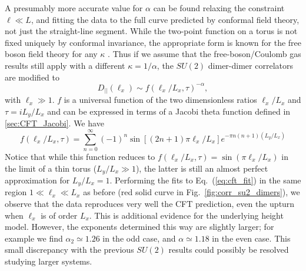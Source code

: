 \documentclass[11pt]{iopart}
\begin{document}
A presumably more accurate value for $\alpha$ can be found relaxing the constraint $\ell \ll L$, and fitting the data to the full curve predicted by conformal field theory, not just the straight-line segment. While the two-point function on a torus is not fixed uniquely by conformal invariance, the appropriate form is known for the free boson field theory for any $\kappa$ \cite{BigYellowBook}. Thus if we assume that the free-boson/Coulomb gas results still apply with a different $\kappa=1/\alpha$,  the $SU(2)$ dimer-dimer correlators are modified to 
\begin{equation}\label{eq:cft_fit}
 D_{||}(\ell_x)\sim f(\ell_x/L_x,\tau)^{-\alpha},
\end{equation}
with $\ell_x \gg 1$. $f$ is a universal function of the two dimensionless ratios $\ell_x/L_x$ and $\tau =i L_y/L_x$ and can be expressed in terms of a Jacobi theta function defined in \ref{sec:CFT_Jacobi}. We have 
\begin{equation}
 f(\ell_x/L_x,\tau)=\sum_{n=0}^{\infty}(-1)^n \sin \left[(2n+1)\pi \ell_x/L_x\right]e^{-\pi n(n+1)(L_y/L_x)}
\end{equation}
Notice that while this function reduces to $f(\ell_x/L_x,\tau)=\sin(\pi \ell_x/L_x)$ in the limit of a thin torus ($L_y/L_x \gg 1$), the latter is still an almost perfect approximation for $L_y/L_x=1$. Performing the fits to Eq.~(\ref{eq:cft_fit}) in the same region $1\ll \ell_x \ll L_x$ as before (red solid curve in Fig.~\ref{fig:corr_su2_dimers}), we observe that the data reproduces very well the CFT prediction, even the upturn when $\ell_x$ is of order $L_x$. This is additional evidence for the underlying height model. However, the exponents determined this way are slightly larger; for example we find $\alpha_2\simeq 1.26$ in the odd case, and $\alpha\simeq 1.18$ in the even case. This small discrepancy with the previous $SU(2)$ results \cite{RVB1,RVB2} could possibly be resolved studying larger systems.  
\end{document}
